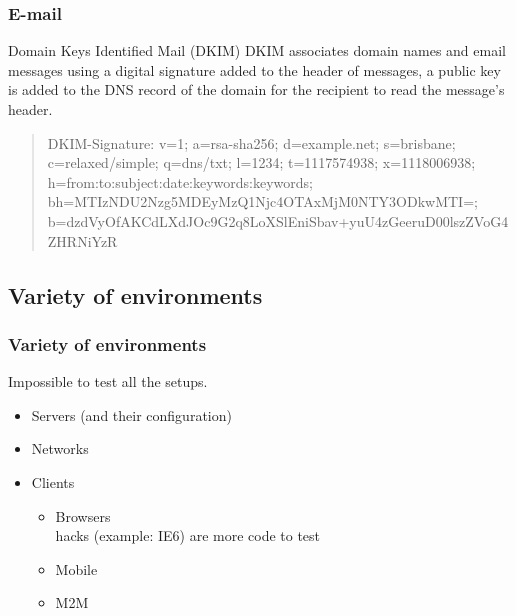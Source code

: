\begin{frame}
\frametitle{E-mail}
\begin{block}{Domain Keys Identified Mail (DKIM)}
DKIM associates domain names and email messages using a digital signature
added to the header of messages, a public key is added to the DNS record of the
domain for the recipient to read the message's header.
\begin{quote}
DKIM-Signature: v=1; a=rsa-sha256; d=example.net; s=brisbane;
c=relaxed/simple; q=dns/txt; l=1234; t=1117574938; x=1118006938;
h=from:to:subject:date:keywords:keywords;
bh=MTIzNDU2Nzg5MDEyMzQ1Njc4OTAxMjM0NTY3ODkwMTI=;
b=dzdVyOfAKCdLXdJOc9G2q8LoXSlEniSbav+yuU4zGeeruD00lszZVoG4ZHRNiYzR
\end{quote}
\end{block}
\end{frame}

\subsection{Variety of environments}

\begin{frame}
\frametitle{Variety of environments}
\begin{center}
Impossible to test all the setups.
\end{center}
\begin{itemize}
\item Servers \small{(and their configuration)}
\item Networks
\item Clients
	\begin{itemize}
	\item Browsers
		\\ hacks \small{(example: IE6)} are more code to test
	\item Mobile
	\item M2M %
	\end{itemize}
\end{itemize}
\end{frame}

